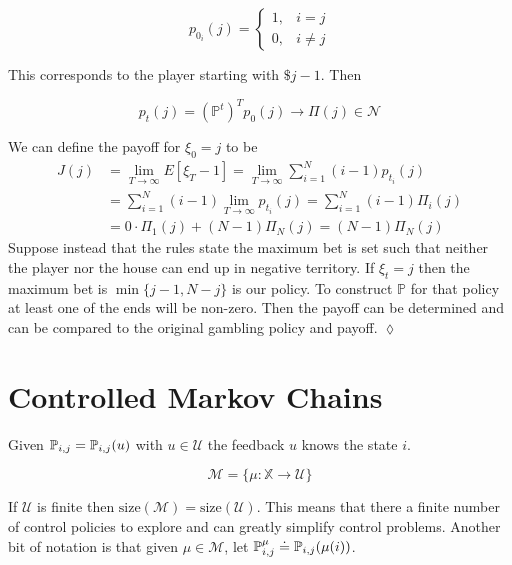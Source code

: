 \begin{example}
\begin{equation*}
p_{0_i}(j) = \begin{cases} 1, & i=j \\ 0, & i\neq j \end{cases}
\end{equation*}

This corresponds to the player starting with $\$j-1$.
Then

\begin{equation*}
p_t(j) = {(\mathbb{P}^t)}^T p_0(j) \rightarrow \Pi(j)\in\mathcal{N}
\end{equation*}

We can define the payoff for $\xi_0=j$ to be
\begin{align*}
J(j) &= \lim_{T\to\infty}E[\xi_T-1] = \lim_{T\to\infty}\sum_{i=1}^N (i-1)p_{t_i}(j) \\
&= \sum_{i=1}^N (i-1)\lim_{T\to\infty} p_{t_i}(j) = \sum_{i=1}^N (i-1) \Pi_i(j) \\
&= 0\cdot \Pi_1(j) + (N-1)\Pi_N(j) = (N-1)\Pi_N(j)
\end{align*}
Suppose instead that the rules state the maximum bet is set such that neither the player nor the house can end up in negative territory.
If $\xi_t=j$ then the maximum bet is $\min\{j-1,N-j\}$ is our policy.
To construct $\mathbb{P}$ for that policy at least one of the ends will be non-zero.
Then the payoff can be determined and can be compared to the original gambling policy and payoff.
$\lozenge$
\end{example}

\section{Controlled Markov Chains}
Given $\mathbb{P}_{i,j}=\mathbb{P}_{i,j}(u)$ with $u\in\mathcal{U}$ the feedback $u$ knows the state $i$.

\begin{equation*}
\mathcal{M}=\{\mu:\mathbb{X}\rightarrow\mathcal{U}\}
\end{equation*}

If $\mathcal{U}$ is finite then $\text{size}(\mathcal{M})=\text{size}(\mathcal{U})$.
This means that there a finite number of control policies to explore and can greatly simplify control problems.
Another bit of notation is that given $\mu\in\mathcal{M}$, let $\mathbb{P}_{i,j}^\mu \doteq \mathbb{P}_{i,j}(\mu(i))$.

